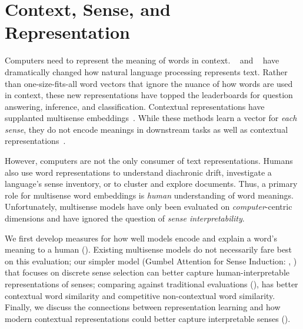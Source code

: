 
        

        
\section{Context, Sense, and Representation}

Computers need to represent the meaning of words in context.
~\cite{devlin-18} and \elmo{}~\cite{peters-18} have
dramatically changed how natural language processing represents text.
Rather than one-size-fits-all word vectors that ignore the nuance of
how words are used in context, these new representations have 
topped the leaderboards for question answering, inference, and
classification.
Contextual representations have supplanted 
multisense embeddings~\cite{CamachoCollados-18}.
While these methods learn a vector for \emph{each sense}, they do not
encode meanings in downstream tasks as well as contextual
representations~\cite{peters-18}.

However, computers are not the only consumer of text representations.
Humans also use word representations to understand diachronic drift,
investigate a language's sense inventory, or to cluster and explore
documents.  Thus, a primary role for multisense word
embeddings is \emph{human} understanding of word meanings.  Unfortunately, multisense models have only been evaluated on
\emph{computer}-centric dimensions and have ignored the question of
\emph{sense interpretability}.  

We first develop measures for how well models encode and explain a
word's meaning to a human ().
Existing multisense models do not necessarily fare best on this
evaluation; our simpler model (Gumbel Attention for Sense Induction:
\gasi{}, ) that focuses on
discrete sense selection can better capture human-interpretable
representations of senses; comparing against
traditional evaluations (), \gasi{}
has better contextual word similarity and 
competitive non-contextual word similarity.
Finally, we discuss the connections between representation
learning and how modern contextual representations could 
better capture interpretable senses ().
